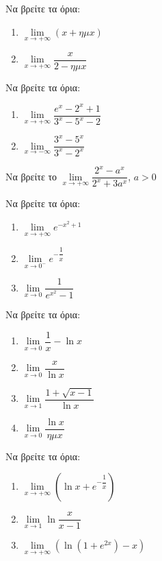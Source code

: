 \documentclass{presentation}
\begin{document}
\begin{askisi}
  Να βρείτε τα όρια:
  \begin{enumerate}
    \item $\lim\limits_{x \to +\infty}{ (x+ημx) }$ \pause
    \item $\lim\limits_{x \to +\infty}{ \dfrac{x}{2-ημx}  }$
  \end{enumerate}
\end{askisi}

\begin{askisi}
  Να βρείτε τα όρια:
  \begin{enumerate}
    \item $\lim\limits_{x \to +\infty}{ \dfrac{e^x-2^x+1}{3^x-5^x-2} }$ \pause
    \item $\lim\limits_{x \to -\infty}{ \dfrac{3^x-5^x}{3^x-2^x}  }$
  \end{enumerate}
\end{askisi}

\begin{askisi}
  Να βρείτε το $\lim\limits_{x \to +\infty}{ \dfrac{2^x-a^x}{2^x+3a^x}  }$, $a>0$
\end{askisi}

\begin{askisi}
  Να βρείτε τα όρια:
  \begin{enumerate}
    \item $\lim\limits_{x \to +\infty}{ e^{-x^2+1} }$ \pause
    \item $\lim\limits_{x \to 0^-}{ e^{-\dfrac{1}{x}} }$\pause
    \item $\lim\limits_{x \to 0}{ \dfrac{1}{e^{x^2}-1}}$
  \end{enumerate}
\end{askisi}

\begin{askisi}
  Να βρείτε τα όρια:
  \begin{enumerate}
    \item $\lim\limits_{x \to 0}{ \dfrac{1}{x}-\ln x }$ \pause
    \item $\lim\limits_{x \to 0}{ \dfrac{x}{\ln x} }$\pause
    \item $\lim\limits_{x \to 1}{ \dfrac{1+\sqrt{x-1}}{\ln x}}$\pause
    \item $\lim\limits_{x \to 0}{ \dfrac{\ln x}{ημx}}$
  \end{enumerate}
\end{askisi}

\begin{askisi}
  Να βρείτε τα όρια:
  \begin{enumerate}
    \item $\lim\limits_{x \to +\infty}{\left(    \ln x + e^{-\dfrac{1}{x}} \right)}$ \pause
    \item $\lim\limits_{x \to 1}{ \ln\dfrac{x}{x-1} }$\pause
    \item $\lim\limits_{x \to +\infty}{\left( \ln (1+e^{2x})-x \right)}$
  \end{enumerate}
\end{askisi}
\end{document}
